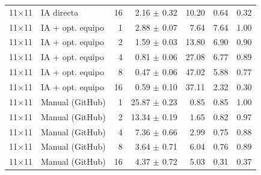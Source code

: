 \begin{tabular}{llrrrrr}
11$\times$11 & IA directa & 16 & 2.16 $\pm$ 0.32 & 10.20 & 0.64 & 0.32 \\
11$\times$11 & IA + opt. equipo & 1 & 2.88 $\pm$ 0.07 & 7.64 & 7.64 & 1.00 \\
11$\times$11 & IA + opt. equipo & 2 & 1.59 $\pm$ 0.03 & 13.80 & 6.90 & 0.90 \\
11$\times$11 & IA + opt. equipo & 4 & 0.81 $\pm$ 0.06 & 27.08 & 6.77 & 0.89 \\
11$\times$11 & IA + opt. equipo & 8 & 0.47 $\pm$ 0.06 & 47.02 & 5.88 & 0.77 \\
11$\times$11 & IA + opt. equipo & 16 & 0.59 $\pm$ 0.10 & 37.11 & 2.32 & 0.30 \\
11$\times$11 & Manual (GitHub) & 1 & 25.87 $\pm$ 0.23 & 0.85 & 0.85 & 1.00 \\
11$\times$11 & Manual (GitHub) & 2 & 13.34 $\pm$ 0.19 & 1.65 & 0.82 & 0.97 \\
11$\times$11 & Manual (GitHub) & 4 & 7.36 $\pm$ 0.66 & 2.99 & 0.75 & 0.88 \\
11$\times$11 & Manual (GitHub) & 8 & 3.64 $\pm$ 0.71 & 6.04 & 0.76 & 0.89 \\
11$\times$11 & Manual (GitHub) & 16 & 4.37 $\pm$ 0.72 & 5.03 & 0.31 & 0.37 \\
\bottomrule
\end{tabular}
